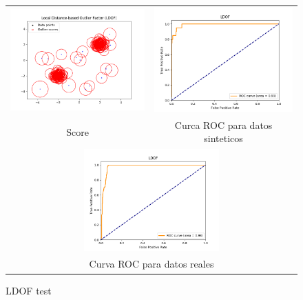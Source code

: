 \begin{figure}[H]
    \begin{tabular}{cc}
      \includegraphics[width=65mm,height=40mm]{imagenes/ldof-sintetico.png} &   \includegraphics[width=65mm,height=40mm]{imagenes/ldof-sintetic-roc.png} \\
    Score & Curca ROC para datos sinteticos \\[6pt]
    \multicolumn{2}{c}{\includegraphics[width=65mm,height=39mm]{imagenes/ldof-test.png} }\\
    \multicolumn{2}{c}{Curva ROC para datos reales}
    \end{tabular}
    \caption{\label{fig:ldoftest} LDOF test}
\end{figure}

